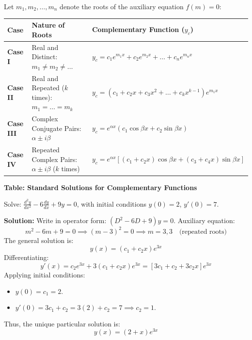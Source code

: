 \begin{theorem}
Let $m_1, m_2, \dots, m_n$ denote the roots of the auxiliary equation $f(m) = 0$:
\begin{center}
\centering
\begin{tabularx}{\textwidth}{l l X}
\toprule
\textbf{Case} & \textbf{Nature of Roots} & \textbf{Complementary Function ($y_{c}$)} \\
\midrule
\textbf{Case I} & Real and Distinct: $m_1 \neq m_2 \neq \dots$ & $y_c = c_1 e^{m_1 x} + c_2 e^{m_2 x} + \dots + c_n e^{m_n x}$ \\
\addlinespace
\textbf{Case II} & Real and Repeated ($k$ times): $m_1 = \dots = m_k$ & $y_c = (c_1 + c_2 x + c_3 x^2 + \dots + c_k x^{k-1})e^{m_1 x}$ \\
\addlinespace
\textbf{Case III} & Complex Conjugate Pairs: $\alpha \pm i\beta$ & $y_c = e^{\alpha x}(c_1 \cos \beta x + c_2 \sin \beta x)$ \\
\addlinespace
\textbf{Case IV} & Repeated Complex Pairs: $\alpha \pm i\beta$ ($k$ times) & $y_c = e^{\alpha x}[(c_1 + c_2 x)\cos \beta x + (c_3 + c_4 x)\sin \beta x]$ \\
\bottomrule
\end{tabularx}
\textbf{Table: Standard Solutions for Complementary Functions}
\end{center}
\end{theorem}

\begin{example}
Solve: $\frac{d^2 y}{dx^2} - 6\frac{dy}{dx} + 9y = 0$, with initial conditions $y(0) = 2$, $y'(0) = 7$.

\textbf{Solution:}
Write in operator form: $(D^2 - 6D + 9)y = 0$.
Auxiliary equation:
\begin{equation*}
m^2 - 6m + 9 = 0 \implies (m - 3)^2 = 0 \implies m = 3, 3 \quad \text{(repeated roots)}
\end{equation*}
The general solution is:
\begin{equation*}
y(x) = (c_1 + c_2 x)e^{3x}
\end{equation*}
Differentiating:
\begin{equation*}
y'(x) = c_2 e^{3x} + 3(c_1 + c_2 x)e^{3x} = [3c_1 + c_2 + 3c_2 x]e^{3x}
\end{equation*}
Applying initial conditions:
\begin{itemize}
    \item $y(0) = c_1 = 2$.
    \item $y'(0) = 3c_1 + c_2 = 3(2) + c_2 = 7 \implies c_2 = 1$.
\end{itemize}
Thus, the unique particular solution is:
\begin{equation*}
y(x) = (2 + x)e^{3x}
\end{equation*}
\end{example}
